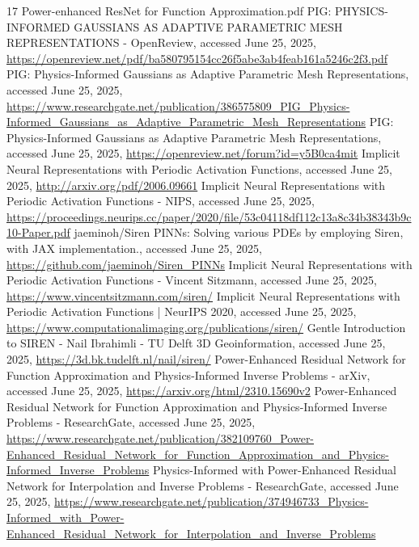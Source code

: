 \documentclass{article}
\begin{document}
\begin{thebibliography}{17}
     Power-enhanced ResNet for Function Approximation.pdf
     PIG: PHYSICS-INFORMED GAUSSIANS AS ADAPTIVE PARAMETRIC MESH REPRESENTATIONS - OpenReview, accessed June 25, 2025, \url{https://openreview.net/pdf/ba580795154cc26f5abe3ab4feab161a5246c2f3.pdf}
     PIG: Physics-Informed Gaussians as Adaptive Parametric Mesh Representations, accessed June 25, 2025, \url{https://www.researchgate.net/publication/386575809_PIG_Physics-Informed_Gaussians_as_Adaptive_Parametric_Mesh_Representations}
     PIG: Physics-Informed Gaussians as Adaptive Parametric Mesh Representations, accessed June 25, 2025, \url{https://openreview.net/forum?id=y5B0ca4mit}
     Implicit Neural Representations with Periodic Activation Functions, accessed June 25, 2025, \url{http://arxiv.org/pdf/2006.09661}
     Implicit Neural Representations with Periodic Activation Functions - NIPS, accessed June 25, 2025, \url{https://proceedings.neurips.cc/paper/2020/file/53c04118df112c13a8c34b38343b9c10-Paper.pdf}
     jaeminoh/Siren PINNs: Solving various PDEs by employing Siren, with JAX implementation., accessed June 25, 2025, \url{https://github.com/jaeminoh/Siren_PINNs}
     Implicit Neural Representations with Periodic Activation Functions - Vincent Sitzmann, accessed June 25, 2025, \url{https://www.vincentsitzmann.com/siren/}
     Implicit Neural Representations with Periodic Activation Functions | NeurIPS 2020, accessed June 25, 2025, \url{https://www.computationalimaging.org/publications/siren/}
     Gentle Introduction to SIREN - Nail Ibrahimli - TU Delft 3D Geoinformation, accessed June 25, 2025, \url{https://3d.bk.tudelft.nl/nail/siren/}
     Power-Enhanced Residual Network for Function Approximation and Physics-Informed Inverse Problems - arXiv, accessed June 25, 2025, \url{https://arxiv.org/html/2310.15690v2}
     Power-Enhanced Residual Network for Function Approximation and Physics-Informed Inverse Problems - ResearchGate, accessed June 25, 2025, \url{https://www.researchgate.net/publication/382109760_Power-Enhanced_Residual_Network_for_Function_Approximation_and_Physics-Informed_Inverse_Problems}
     Physics-Informed with Power-Enhanced Residual Network for Interpolation and Inverse Problems - ResearchGate, accessed June 25, 2025, \url{https://www.researchgate.net/publication/374946733_Physics-Informed_with_Power-Enhanced_Residual_Network_for_Interpolation_and_Inverse_Problems}

\end{thebibliography}
\end{document}
